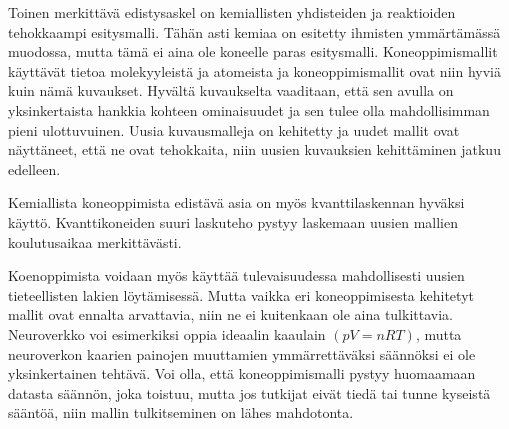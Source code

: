 \documentclass[finnish,twoside,censored,tkt,sw-line]{HYthesisML}
\begin{document}
Toinen merkittävä edistysaskel on kemiallisten yhdisteiden ja reaktioiden tehokkaampi esitysmalli.
Tähän asti kemiaa on esitetty ihmisten ymmärtämässä muodossa, mutta tämä ei aina ole koneelle paras esitysmalli.
Koneoppimismallit käyttävät tietoa molekyyleistä ja atomeista ja koneoppimismallit ovat niin hyviä kuin nämä kuvaukset.
Hyvältä kuvaukselta vaaditaan, että sen avulla on yksinkertaista hankkia kohteen ominaisuudet ja sen tulee olla mahdollisimman pieni ulottuvuinen.
Uusia kuvausmalleja on kehitetty ja uudet mallit ovat näyttäneet, että ne ovat tehokkaita, niin uusien kuvauksien kehittäminen jatkuu edelleen.

Kemiallista koneoppimista edistävä asia on myös kvanttilaskennan hyväksi käyttö.
Kvanttikoneiden suuri laskuteho pystyy laskemaan uusien mallien koulutusaikaa merkittävästi.

Koenoppimista voidaan myös käyttää tulevaisuudessa mahdollisesti uusien tieteellisten lakien löytämisessä.
Mutta vaikka eri koneoppimisesta kehitetyt mallit ovat ennalta arvattavia, niin ne ei kuitenkaan ole aina tulkittavia.
Neuroverkko voi esimerkiksi oppia ideaalin kaaulain $(pV=nRT)$, mutta neuroverkon kaarien painojen muuttamien ymmärrettäväksi säännöksi ei ole yksinkertainen tehtävä.
Voi olla, että koneoppimismalli pystyy huomaamaan datasta säännön, joka toistuu, mutta jos tutkijat eivät tiedä tai tunne kyseistä sääntöä, niin mallin tulkitseminen on lähes mahdotonta.

\cleardoublepage                          %
{}  %
\printbibliography

\backmatter



\end{document}
